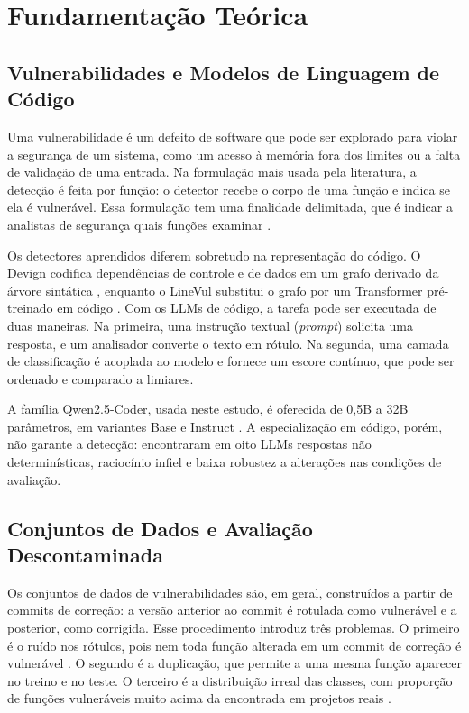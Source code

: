 \chapter{Fundamentação Teórica}

\section{Vulnerabilidades e Modelos de Linguagem de Código}

Uma vulnerabilidade é um defeito de software que pode ser explorado para violar a segurança de um sistema, como um acesso à memória fora dos limites ou a falta de validação de uma entrada. Na formulação mais usada pela literatura, a detecção é feita por função: o detector recebe o corpo de uma função e indica se ela é vulnerável. Essa formulação tem uma finalidade delimitada, que é indicar a analistas de segurança quais funções examinar \cite{fu2022linevul}.

Os detectores aprendidos diferem sobretudo na representação do código. O Devign codifica dependências de controle e de dados em um grafo derivado da árvore sintática \cite{zhou2019devign}, enquanto o LineVul substitui o grafo por um Transformer pré-treinado em código \cite{fu2022linevul}. Com os LLMs de código, a tarefa pode ser executada de duas maneiras. Na primeira, uma instrução textual (\textit{prompt}) solicita uma resposta, e um analisador converte o texto em rótulo. Na segunda, uma camada de classificação é acoplada ao modelo e fornece um escore contínuo, que pode ser ordenado e comparado a limiares.

A família Qwen2.5-Coder, usada neste estudo, é oferecida de 0,5B a 32B parâmetros, em variantes Base e Instruct \cite{hui2024qwen}. A especialização em código, porém, não garante a detecção:  encontraram em oito LLMs respostas não determinísticas, raciocínio infiel e baixa robustez a alterações nas condições de avaliação.

\section{Conjuntos de Dados e Avaliação Descontaminada}

Os conjuntos de dados de vulnerabilidades são, em geral, construídos a partir de commits de correção: a versão anterior ao commit é rotulada como vulnerável e a posterior, como corrigida. Esse procedimento introduz três problemas. O primeiro é o ruído nos rótulos, pois nem toda função alterada em um commit de correção é vulnerável \cite{chen2023diversevul}. O segundo é a duplicação, que permite a uma mesma função aparecer no treino e no teste. O terceiro é a distribuição irreal das classes, com proporção de funções vulneráveis muito acima da encontrada em projetos reais \cite{chakraborty2020reveal}.

